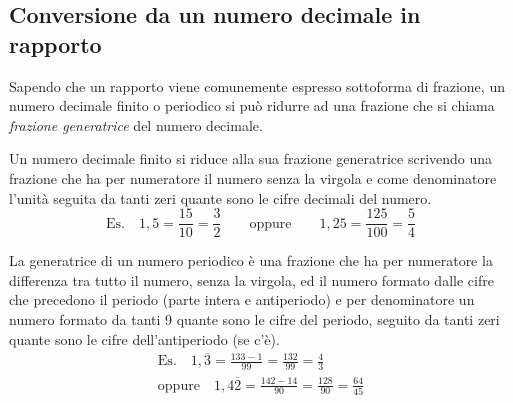 \subsection{Conversione da un numero decimale in rapporto}

Sapendo che un rapporto viene comunemente espresso sottoforma di frazione, un
numero decimale finito o periodico si può ridurre ad una frazione che si chiama
\emph{frazione generatrice} del numero decimale.

Un numero decimale finito si riduce alla sua frazione generatrice scrivendo una
frazione che ha per numeratore il numero senza la virgola e come denominatore
l'unità seguita da tanti zeri quante sono le cifre decimali del numero.
\[
  \text{Es.}\quad 1{,}5 = \frac{15}{10} = \frac{3}{2}
  \qquad\text{oppure}\qquad 1{,}25 = \frac{125}{100} = \frac{5}{4}
\]

La generatrice di un numero periodico è una frazione che ha per numeratore la
differenza tra tutto il numero, senza la virgola, ed il numero formato dalle
cifre che precedono il periodo (parte intera e antiperiodo) e per denominatore
un numero formato da tanti 9 quante sono le cifre del periodo, seguito da tanti
zeri quante sono le cifre dell'antiperiodo (se c'è).
\begin{gather*}
  \text{Es.}\quad 1{,}\overline{3} = \frac{133-1}{99} = \frac{132}{99}
  = \frac{4}{3} \\[2pt]
  \text{oppure}\quad
  1{,}4\overline{2} = \frac{142-14}{90} = \frac{128}{90} = \frac{64}{45}
\end{gather*}

